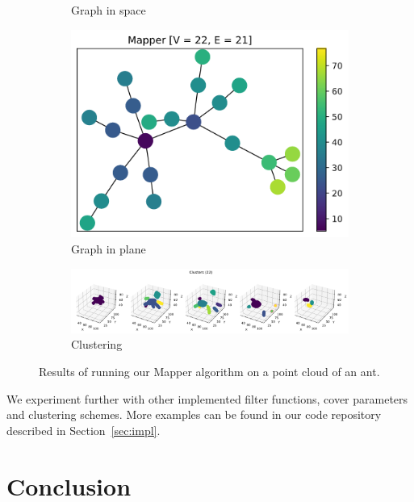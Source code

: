 \documentclass{article}
\begin{document}
\begin{figure}[ht]
\begin{subfigure}[c]{0.3\columnwidth}
        \caption{Graph in space}
        \label{fig:ant-space}
    \end{subfigure}
    \begin{subfigure}[c]{0.3\columnwidth}
        \centering
        \includegraphics[width=\textwidth]{ant-graph-2d}
        \caption{Graph in plane}
        \label{fig:ant-plane}
    \end{subfigure}
    \begin{subfigure}[c]{0.9\columnwidth}
        \centering
        \includegraphics[width=\textwidth]{ant-clusters}
        \caption{Clustering}
        \label{fig:ant-cluster}
    \end{subfigure}
    \caption{Results of running our Mapper algorithm on a point cloud of an ant.}
    \label{fig:ant}
\end{figure}

We experiment further with other implemented filter functions, cover parameters and clustering schemes.
More examples can be found in our code repository described in Section~\ref{sec:impl}.

\section{Conclusion}\label{sec:concl}



\end{document}
